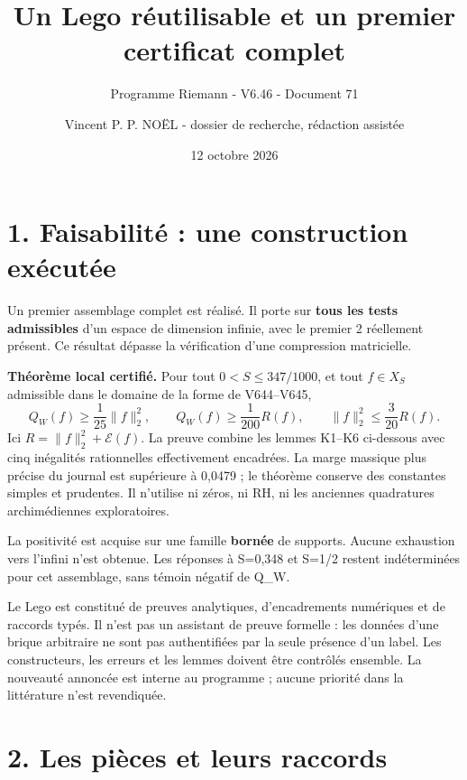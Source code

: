 \documentclass[
  10pt,
  a4paper,
]{article}
\title{Un Lego réutilisable et un premier certificat complet}
\subtitle{Programme Riemann - V6.46 - Document 71}
\author{Vincent P. P. NOËL - dossier de recherche, rédaction assistée}
\date{12 octobre 2026}
\begin{document}
\maketitle

{
\setcounter{tocdepth}{2}
\tableofcontents
}
\hypertarget{faisabilituxe9-une-construction-exuxe9cutuxe9e}{%
\section{1. Faisabilité : une construction
exécutée}\label{faisabilituxe9-une-construction-exuxe9cutuxe9e}}

Un premier assemblage complet est réalisé. Il porte sur \textbf{tous les
tests admissibles} d'un espace de dimension infinie, avec le premier 2
réellement présent. Ce résultat dépasse la vérification d'une
compression matricielle.

\textbf{Théorème local certifié.} Pour tout \(0<S\le347/1000\), et tout
\(f\in X_S\) admissible dans le domaine de la forme de V644--V645, \[
\boxed{Q_W(f)\ge\frac1{25}\|f\|_2^2,
\qquad Q_W(f)\ge\frac1{200}R(f),
\qquad\|f\|_2^2\le\frac3{20}R(f).}
\] Ici \(R=\|f\|_2^2+\mathcal E(f)\). La preuve combine les lemmes
K1--K6 ci-dessous avec cinq inégalités rationnelles effectivement
encadrées. La marge massique plus précise du journal est supérieure à
0,0479 ; le théorème conserve des constantes simples et prudentes. Il
n'utilise ni zéros, ni RH, ni les anciennes quadratures archimédiennes
exploratoires.

La positivité est acquise sur une famille \textbf{bornée} de supports.
Aucune exhaustion vers l'infini n'est obtenue. Les réponses à S=0,348 et
S=1/2 restent indéterminées pour cet assemblage, sans témoin négatif de
Q\_W.

Le Lego est constitué de preuves analytiques, d'encadrements numériques
et de raccords typés. Il n'est pas un assistant de preuve formelle : les
données d'une brique arbitraire ne sont pas authentifiées par la seule
présence d'un label. Les constructeurs, les erreurs et les lemmes
doivent être contrôlés ensemble. La nouveauté annoncée est interne au
programme ; aucune priorité dans la littérature n'est revendiquée.

\hypertarget{les-piuxe8ces-et-leurs-raccords}{%
\section{2. Les pièces et leurs
raccords}\label{les-piuxe8ces-et-leurs-raccords}}
\end{document}
